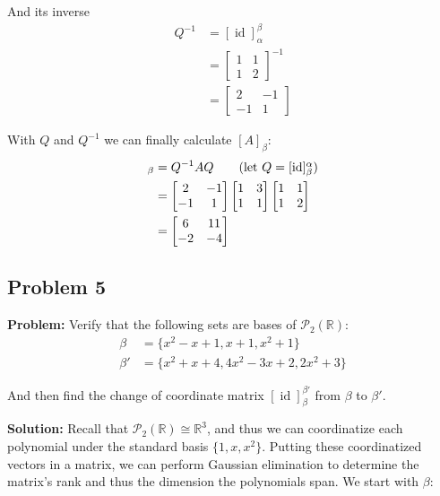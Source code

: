 \documentclass{article}
\begin{document}
And its inverse
\begin{align*}
  Q^{-1}&=[\operatorname{id}]_\alpha^\beta\\
  &=\begin{bmatrix}
    1&1\\1&2
  \end{bmatrix}^{-1}\\
  &=\begin{bmatrix}
    2&-1\\-1&1
  \end{bmatrix}
\end{align*}

With $Q$ and $Q^{-1}$ we can finally calculate $[A]_\beta$:
\begin{align*}
  [A]_\beta&=Q^{-1}AQ\tag{let $Q=[\operatorname{id}]_\beta^\alpha$}\\
  &=\begin{bmatrix}
    2&-1\\-1&1
  \end{bmatrix}
  \begin{bmatrix}
    1&3\\1&1
  \end{bmatrix}
  \begin{bmatrix}
    1&1\\1&2
  \end{bmatrix}\\
  &=\begin{bmatrix}
    6&11\\-2&-4
  \end{bmatrix}
\end{align*}

\subsection*{Problem 5}
\noindent\textbf{Problem:} Verify that the following sets are bases of $\mathcal P_2(\mathbb R)$:
\begin{align*}
  \beta&=\{x^2-x+1,x+1,x^2+1\}\\
  \beta'&=\{x^2+x+4,4x^2-3x+2,2x^2+3\}
\end{align*}

And then find the change of coordinate matrix $[\operatorname{id}]_{\beta}^{\beta'}$ from $\beta$ to $\beta'$.
\bigskip

\noindent\textbf{Solution:} Recall that $\mathcal P_2(\mathbb R)\cong\mathbb R^3$, and thus we can coordinatize each polynomial under the standard basis $\{1,x,x^2\}$. Putting these coordinatized vectors in a matrix, we can perform Gaussian elimination to determine the matrix's rank and thus the dimension the polynomials span. We start with $\beta$:
\end{document}
